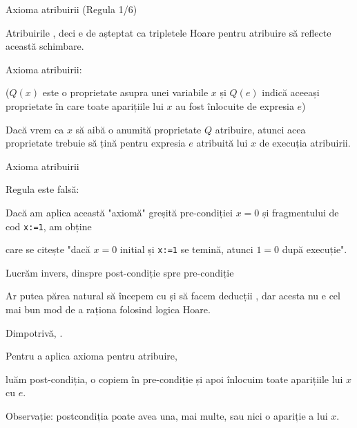 \begin{frame}{Axioma atribuirii (Regula 1/6)}

Atribuirile , deci e de așteptat ca tripletele Hoare pentru atribuire să reflecte această schimbare.

\medskip \pause
\alert{Axioma atribuirii:}
\begin{center}
\end{center}
{\footnotesize
($Q(x)$ este o proprietate asupra unei variabile $x$ și $Q(e)$ indică aceeași proprietate în care toate aparițiile lui $x$ au fost înlocuite de expresia $e$)
}

\medskip \pause
Dacă vrem ca $x$ să aibă o anumită proprietate $Q$  atribuire, atunci acea proprietate trebuie să țină pentru expresia $e$ atribuită lui $x$  de execuția atribuirii.
\end{frame}


\begin{frame}{Axioma atribuirii}

\begin{example}
Regula  este falsă: 

Dacă am aplica această "axiomă" greșită pre-condiției $x=0$ și fragmentului de cod \texttt{x:=1}, am obține
\begin{center}
\end{center}
care se citește "dacă $x=0$ initial și \texttt{x:=1} se temină, atunci $1=0$ după execuție".
\end{example}
\end{frame}

\begin{frame}{Lucrăm invers, dinspre post-condiție spre pre-condiție}

Ar putea părea natural să începem cu  și să facem deducții , dar acesta nu e cel mai bun mod de a raționa folosind logica Hoare.

	\medskip
Dimpotrivă, .

\pause
	\begin{example}
		Pentru a aplica axioma pentru atribuire,
		\begin{center}
		\end{center}
		luăm post-condiția, o copiem în pre-condiție și apoi înlocuim toate aparițiile lui $x$ cu $e$.

		Observație: postcondiția poate avea una, mai multe, sau nici o apariție a lui $x$.
	\end{example}

\end{frame}

